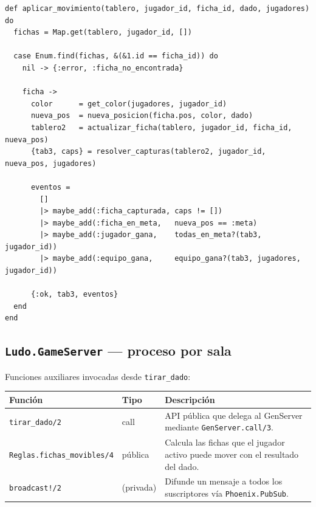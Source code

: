 \documentclass[11pt,a4paper]{article}
\begin{document}
\begin{lstlisting}[caption={Esqueleto de \texttt{aplicar\_movimiento/5}}]
def aplicar_movimiento(tablero, jugador_id, ficha_id, dado, jugadores) do
  fichas = Map.get(tablero, jugador_id, [])

  case Enum.find(fichas, &(&1.id == ficha_id)) do
    nil -> {:error, :ficha_no_encontrada}

    ficha ->
      color      = get_color(jugadores, jugador_id)
      nueva_pos  = nueva_posicion(ficha.pos, color, dado)
      tablero2   = actualizar_ficha(tablero, jugador_id, ficha_id, nueva_pos)
      {tab3, caps} = resolver_capturas(tablero2, jugador_id, nueva_pos, jugadores)

      eventos =
        []
        |> maybe_add(:ficha_capturada, caps != [])
        |> maybe_add(:ficha_en_meta,   nueva_pos == :meta)
        |> maybe_add(:jugador_gana,    todas_en_meta?(tab3, jugador_id))
        |> maybe_add(:equipo_gana,     equipo_gana?(tab3, jugadores, jugador_id))

      {:ok, tab3, eventos}
  end
end
\end{lstlisting}

\subsection{\texttt{Ludo.GameServer} --- proceso por sala}

Funciones auxiliares invocadas desde \texttt{tirar\_dado}:

\begin{center}
\renewcommand{\arraystretch}{1.3}
\begin{tabularx}{\linewidth}{l l X}
\toprule
\textbf{Función} & \textbf{Tipo} & \textbf{Descripción} \\
\midrule
\texttt{tirar\_dado/2}       & call    & API pública que delega al GenServer mediante \texttt{GenServer.call/3}. \\
\texttt{Reglas.fichas\_movibles/4} & pública & Calcula las fichas que el jugador activo puede mover con el resultado del dado. \\
\texttt{broadcast!/2}        & (privada) & Difunde un mensaje a todos los suscriptores vía \texttt{Phoenix.PubSub}. \\
\bottomrule
\end{tabularx}
\end{center}
\end{document}
